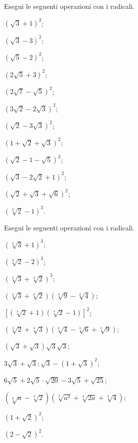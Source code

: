 \begin{esercizio}[\Ast]
 \label{ese:2.70}
Esegui le seguenti operazioni con i radicali.
 \begin{multicols}{3}
 \begin{enumeratea}
 \item $(\sqrt 3+1)^2$;
 \item $(\sqrt 3-3)^2$;
 \item $(\sqrt 5-2)^2$;
 \item $(2\sqrt 5+3)^2$;
 \item $(2\sqrt 7-\sqrt 5)^2$;
 \item $(3\sqrt 2-2\sqrt 3)^2$;
 \item $(\sqrt 2-3\sqrt 3)^2$;
 \item $(1+\sqrt 2+\sqrt 3)^2$;
 \item $(\sqrt 2-1-\sqrt 5)^2$;
 \item $(\sqrt 3-2\sqrt 2+1)^2$;
 \item $(\sqrt 2+\sqrt 3+\sqrt 6)^2$;
 \item $(\sqrt[3]2-1)^3$.
 \end{enumeratea}
 \end{multicols}
\end{esercizio}


\begin{esercizio}[\Ast]
 \label{ese:2.71}
Esegui le seguenti operazioni con i radicali.
 \begin{multicols}{2}
 \begin{enumeratea}
 \item $(\sqrt[3]3+1)^3$;
 \item $(\sqrt[3]2-2)^3$;
 \item $(\sqrt[3]3+\sqrt[3]2)^3$;
 \item $(\sqrt[3]3+\sqrt[3]2)(\sqrt[3]9-\sqrt[3]4)$;
 \item $\left[(\sqrt[4]2+1)(\sqrt[4]2-1)\right]^2$;
 \item $(\sqrt[3]2+\sqrt[3]3)(\sqrt[3]4-\sqrt[3]6+\sqrt[3]9)$;
 \item $(\sqrt 3+\sqrt 3)\sqrt 3 \sqrt 3$;
 \item $3\sqrt 3+\sqrt 3:\sqrt 3-(1+\sqrt 3)^2$;
 \item $6\sqrt 5+2\sqrt 5\cdot \sqrt{20}-3\sqrt 5+\sqrt{25}$;
 \item $(\sqrt[3]a-\sqrt[3]2)(\sqrt[3]{a^2}+\sqrt[3]{2a}+\sqrt[3]4)$;
 \item $(1+\sqrt 2)^2$;
 \item $(2-\sqrt 2)^2$.
 \end{enumeratea}
 \end{multicols}
\end{esercizio}

